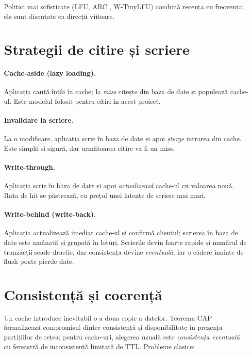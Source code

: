 Politici mai sofisticate (LFU, ARC \cite{megiddo}, W-TinyLFU) combină recența cu frecvența; ele sunt
discutate ca direcții viitoare.

\section{Strategii de citire și scriere}

\paragraph{Cache-aside (lazy loading).} Aplicația caută întâi în cache; la \emph{miss} citește din baza
de date și populează cache-ul. Este modelul folosit pentru citiri în acest proiect.

\paragraph{Invalidare la scriere.} La o modificare, aplicația scrie în baza de date și apoi
\emph{șterge} intrarea din cache. Este simplă și sigură, dar următoarea citire va fi un miss.

\paragraph{Write-through.} Aplicația scrie în baza de date și apoi \emph{actualizează} cache-ul cu
valoarea nouă. Rata de hit se păstrează, cu prețul unei latențe de scriere mai mari.

\paragraph{Write-behind (write-back).} Aplicația actualizează imediat cache-ul și confirmă clientul;
scrierea în baza de date este amânată și grupată în loturi. Scrierile devin foarte rapide și numărul de
tranzacții scade drastic, dar consistența devine \emph{eventuală}, iar o cădere înainte de flush poate
pierde date.

\section{Consistență și coerență}

Un cache introduce inevitabil o a doua copie a datelor. Teorema CAP \cite{brewer} formalizează
compromisul dintre consistență și disponibilitate în prezența partițiilor de rețea; pentru cache-uri,
alegerea uzuală este \emph{consistența eventuală} cu fereastră de inconsistență limitată de TTL.
Probleme clasice:

